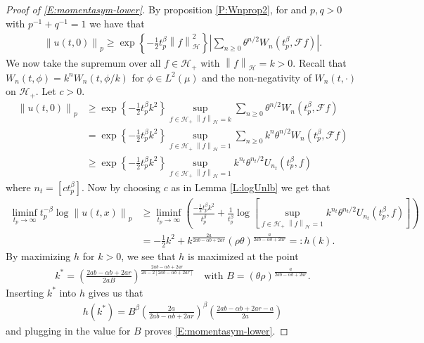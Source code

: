 \documentclass[a4paper,11pt]{article}
\numberwithin{equation}{section}
\numberwithin{equation}{section}
\theoremstyle{plain}
\theoremstyle{definition}
\newcommand{\Norm}[1]{\left\|  #1   \right\|}
\begin{document}
\begin{proof}[Proof of \eqref{E:momentasym-lower}]
  By proposition \ref{P:Wnprop2}, for and $p,q >0$ with $p^{-1}+q^{-1} = 1$ we have that
  \begin{align*}
    \Norm{u(t,0)}_p \ge \exp\left\{ -\frac{1}{2} t_p^\beta \Norm{f}_{\mathcal{H}}^2 \right\}\left| \sum_{n \ge 0} \theta^{n/2} W_n(t_p^\beta, \mathcal{F}f) \right|.
  \end{align*}
  We now take the supremum over all $f \in \mathcal{H}_+$ with $\Norm{f}_{\mathcal{H}}=k >0 $.
  Recall that $W_n(t,\phi) = k^nW_n(t,\phi/k)$ for $\phi \in L^2(\mu)$ and the non-negativity of $W_n(t,\cdot)$ on $\mathcal{H}_+$. Let $c>0$.
  \begin{align*}
      \Norm{u(t,0)}_p
    & \ge   \exp\left\{ -\frac{1}{2} t_p^\beta k^2 \right\} \sup_{f\in \mathcal{H}_+ \; \Norm{f}_{\mathcal{H}}=k}\sum_{n \ge 0} \theta^{n/2} W_n(t_p^\beta, \mathcal{F}f) \\
    & = \exp\left\{ -\frac{1}{2} t_p^\beta k^2 \right\} \sup_{f\in \mathcal{H}_+ \; \Norm{f}_{\mathcal{H}}=1}\sum_{n \ge 0} k^n \theta^{n/2} W_n(t_p^\beta, \mathcal{F}f) \\
    & \ge \exp\left\{ -\frac{1}{2} t_p^\beta k^2 \right\} \sup_{f\in \mathcal{H}_+ \; \Norm{f}_{\mathcal{H}}=1} k^{n_t} \theta^{{n_t}/2} U_{n_t}(t_p^\beta, f)
  \end{align*}
  where $n_t = [ct_p^\beta]$. Now by choosing $c$ as in Lemma \ref{L:logUnlb} we get that
  \begin{align*}
    \liminf_{t_p \to \infty} t_p^{-\beta} \log \Norm{u(t,x)}_p
    & \ge   \liminf_{t_p \to \infty} \left( \frac{-\frac{1}{2}t_p^\beta k^2}{t_p^\beta} + \frac{1}{t_p^\beta}\log \left[ \sup_{f\in \mathcal{H}_+ \; \Norm{f}_{\mathcal{H}}=1} k^{n_t} \theta^{{n_t}/2} U_{n_t}(t_p^\beta, f) \right]  \right) \\
    & = -\frac{1}{2}k^2 + k^{ \frac{2a}{2ab-\alpha b +2ar} }(\rho \theta)^{\frac{a}{2ab -\alpha b + 2ar}} =: h(k).
  \end{align*}
  By maximizing $h$ for $k>0$, we see that $h$ is maximized at the point
  \begin{align*}
    k^* = \left( \frac{2ab -\alpha b + 2ar}{2aB} \right)^{ \frac{2ab-\alpha b +2ar}{2a-2[2ab-\alpha b + 2ar]}} \quad \text{with $B=(\theta\rho)^{ \frac{a}{2ab-\alpha b + 2ar} }$}.
  \end{align*}
  Inserting $k^*$ into $h$ gives us that
  \begin{align*}
    h(k^*) = B^{\beta}\left( \frac{2a}{2ab - \alpha b +2ar} \right)^\beta \left( \frac{2ab-\alpha b + 2ar -a }{2a} \right)
  \end{align*}
  and plugging in the value for $B$ proves \eqref{E:momentasym-lower}.
\end{proof}
\end{document}
